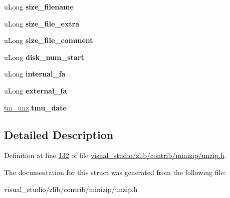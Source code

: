 \begin{DoxyCompactItemize}
u\+Long {\bfseries size\+\_\+filename}
\item 
\mbox{\label{structunz__file__info__s_a479402dcb3555c922e3ce87c8f967990}} 
u\+Long {\bfseries size\+\_\+file\+\_\+extra}
\item 
\mbox{\label{structunz__file__info__s_afa9feffb3b9c9c03e02599118d5f548e}} 
u\+Long {\bfseries size\+\_\+file\+\_\+comment}
\item 
\mbox{\label{structunz__file__info__s_ab7bfba2b7d0cdb7260a7cd9f9ccd00ff}} 
u\+Long {\bfseries disk\+\_\+num\+\_\+start}
\item 
\mbox{\label{structunz__file__info__s_aa20738bf82bca71cc950b9475b5d8c3c}} 
u\+Long {\bfseries internal\+\_\+fa}
\item 
\mbox{\label{structunz__file__info__s_ae3365fdb260668fca60bfb975b1513aa}} 
u\+Long {\bfseries external\+\_\+fa}
\item 
\mbox{\label{structunz__file__info__s_ad52c08c65349f674b00244d81cdb1736}} 
\hyperlink{structtm__unz__s}{tm\+\_\+unz} {\bfseries tmu\+\_\+date}
\end{DoxyCompactItemize}


\subsection{Detailed Description}


Definition at line \hyperlink{visual__studio_2zlib_2contrib_2minizip_2unzip_8h_source_l00132}{132} of file \hyperlink{visual__studio_2zlib_2contrib_2minizip_2unzip_8h_source}{visual\+\_\+studio/zlib/contrib/minizip/unzip.\+h}.



The documentation for this struct was generated from the following file\+:\begin{DoxyCompactItemize}
\item 
visual\+\_\+studio/zlib/contrib/minizip/unzip.\+h\end{DoxyCompactItemize}
